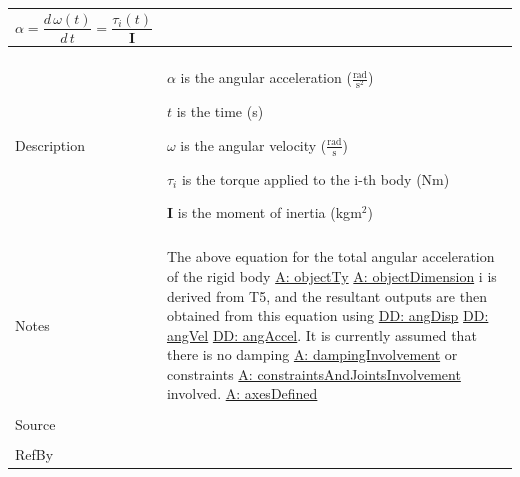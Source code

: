 \documentclass[12pt]{article}
\begin{document}
\begin{minipage}{\textwidth}
\begin{tabular}{p{} p{}}
\begin{displaymath}
                                                                             α=\frac{d\,ω\left(t\right)}{d\,t}=\frac{{τ_{i}}\left(t\right)}{\mathbf{I}}
                                                                             \end{displaymath}
                                                                             \\ \midrule \\
                                                                             Description & \begin{symbDescription}
                                                                                           \item{$α$ is the angular acceleration ($\frac{\text{rad}}{\text{s}^{2}}$)}
                                                                                           \item{$t$ is the time (s)}
                                                                                           \item{$ω$ is the angular velocity ($\frac{\text{rad}}{\text{s}}$)}
                                                                                           \item{${τ_{i}}$ is the torque applied to the i-th body (Nm)}
                                                                                           \item{$\mathbf{I}$ is the moment of inertia (kg$\text{m}^{2}$)}
                                                                                           \end{symbDescription}
                                                                                           \\ \midrule \\
                                                                                           Notes & The above equation for the total angular acceleration of the rigid body \hyperref[assumpOT]{A: objectTy} \hyperref[assumpOD]{A: objectDimension} i is derived from T5, and the resultant outputs are then obtained from this equation using \hyperref[DD:angDisp]{DD: angDisp} \hyperref[DD:angVel]{DD: angVel} \hyperref[DD:angAccel]{DD: angAccel}. It is currently assumed that there is no damping \hyperref[assumpDI]{A: dampingInvolvement} or constraints \hyperref[assumpCAJI]{A: constraintsAndJointsInvolvement} involved. \hyperref[assumpAD]{A: axesDefined}
                                                                                                   \\ \midrule \\
                                                                                                   Source & \\ \midrule \\
                                                                                                            RefBy & 
\\ \bottomrule \end{tabular}
\end{minipage}
\end{document}
